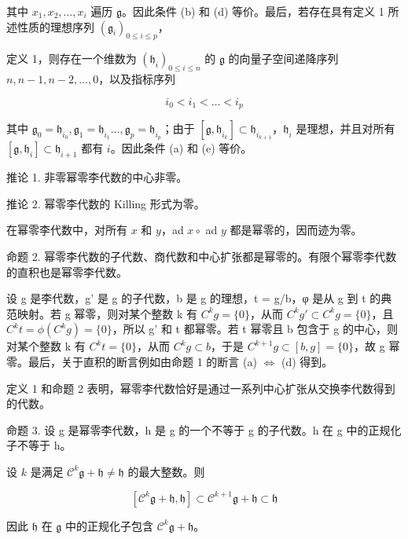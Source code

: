 其中 \(x_{1}, x_{2}, \ldots, x_{i}\) 遍历 \(\mathfrak{g}\)。因此条件 (b) 和 (d) 等价。最后，若存在具有定义 1 所述性质的理想序列 \((\mathfrak{g}_i)_{0 \leqslant i \leqslant p}\)，

定义 1，则存在一个维数为 \((\mathfrak{h}_i)_{0\leqslant i\leqslant n}\) 的 \(\mathfrak{g}\) 的向量子空间递降序列 \(n,n - 1,n - 2,\ldots ,0\)，以及指标序列

\[
i _ {0} <   i _ {1} <   \dots <   i _ {p}
\]

其中 \(\mathfrak{g}_0 = \mathfrak{h}_{i_0},\mathfrak{g}_1 = \mathfrak{h}_{i_1}\dots ,\mathfrak{g}_p = \mathfrak{h}_{i_p}\)；由于 \([\mathfrak{g},\mathfrak{h}_{i_k}]\subset \mathfrak{h}_{i_{k + 1}}\)，\(\mathfrak{h}_i\) 是理想，并且对所有 \([\mathfrak{g},\mathfrak{h}_i]\subset \mathfrak{h}_{i + 1}\) 都有 \(i\)。因此条件 (a) 和 (e) 等价。

推论 1. 非零幂零李代数的中心非零。

推论 2. 幂零李代数的 Killing 形式为零。

在幂零李代数中，对所有 \(x\) 和 \(y\)，ad \(x \circ\) ad \(y\) 都是幂零的，因而迹为零。

命题 2. 幂零李代数的子代数、商代数和中心扩张都是幂零的。有限个幂零李代数的直积也是幂零李代数。

设 g 是李代数，g' 是 g 的子代数，b 是 g 的理想，t = g/b，φ 是从 g 到 t 的典范映射。若 g 幂零，则对某个整数 k 有 \(C^{k}g = \{0\}\)，从而 \(C^{k}g' \subset C^{k}g = \{0\}\)，且 \(C^{k}t = \phi(C^{k}g) = \{0\}\)，所以 g' 和 t 都幂零。若 t 幂零且 b 包含于 g 的中心，则对某个整数 k 有 \(C^{k}t = \{0\}\)，从而 \(C^{k}g \subset b\)，于是 \(C^{k+1}g \subset [b, g] = \{0\}\)，故 g 幂零。最后，关于直积的断言例如由命题 1 的断言 (a) \(\Leftrightarrow\) (d) 得到。

定义 1 和命题 2 表明，幂零李代数恰好是通过一系列中心扩张从交换李代数得到的代数。

命题 3. 设 g 是幂零李代数，h 是 g 的一个不等于 g 的子代数。h 在 g 中的正规化子不等于 h。

设 \(k\) 是满足 \(\mathcal{C}^k\mathfrak{g} + \mathfrak{h}\neq \mathfrak{h}\) 的最大整数。则

\[
[ \mathcal {C} ^ {k} \mathfrak {g} + \mathfrak {h}, \mathfrak {h} ] \subset \mathcal {C} ^ {k + 1} \mathfrak {g} + \mathfrak {h} \subset \mathfrak {h}
\]

因此 \(\mathfrak{h}\) 在 \(\mathfrak{g}\) 中的正规化子包含 \(\mathcal{C}^k\mathfrak{g} + \mathfrak{h}\)。


